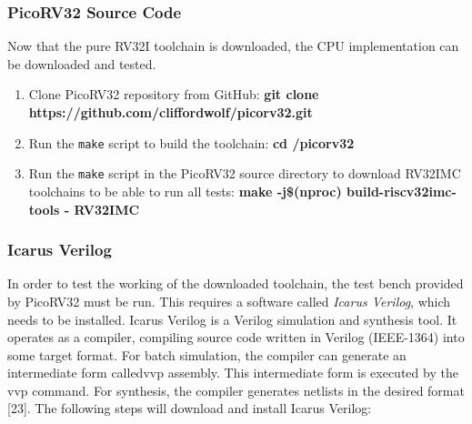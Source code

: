 \subsubsection{PicoRV32 Source Code}
 \label{sect6_3_2_2}
Now that the pure RV32I toolchain is downloaded, the CPU implementation can be downloaded and tested.

\begin{enumerate}
\item Clone PicoRV32 repository from GitHub:\newline
\small \textbf{git clone https://github.com/cliffordwolf/picorv32.git}

\item Run the \verb|make| script to build the toolchain:\newline
\small \textbf{cd \texttildelow /picorv32}

\item Run the \verb|make| script in the PicoRV32 source directory to download RV32IMC toolchains to be able to run all tests:\newline
\small \textbf{make -j\$(nproc) build-riscv32imc-tools - RV32IMC}

\end{enumerate}

\subsubsection{Icarus Verilog}
\label{sect6_3_2_3}
In order to test the working of the downloaded toolchain, the test bench provided by PicoRV32 must be run. This requires a software called \textit{Icarus Verilog}, which needs to be installed. Icarus Verilog is a Verilog simulation and synthesis tool. It operates as a compiler, compiling source code written in Verilog (IEEE-1364) into some target format. For batch simulation, the compiler can generate an intermediate form calledvvp assembly. This intermediate form is executed by the vvp command. For synthesis, the compiler generates netlists in the desired format [23]. The following steps will download and install Icarus Verilog:

